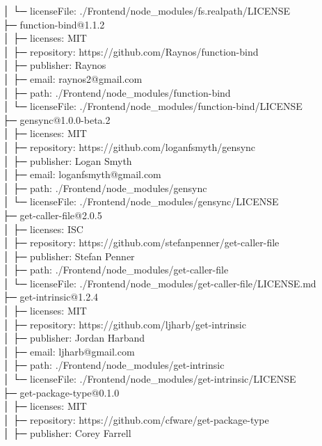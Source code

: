 │  └─ licenseFile: ./Frontend/node\_modules/fs.realpath/LICENSE\\
├─ function-bind@1.1.2\\
│  ├─ licenses: MIT\\
│  ├─ repository: https://github.com/Raynos/function-bind\\
│  ├─ publisher: Raynos\\
│  ├─ email: raynos2@gmail.com\\
│  ├─ path: ./Frontend/node\_modules/function-bind\\
│  └─ licenseFile: ./Frontend/node\_modules/function-bind/LICENSE\\
├─ gensync@1.0.0-beta.2\\
│  ├─ licenses: MIT\\
│  ├─ repository: https://github.com/loganfsmyth/gensync\\
│  ├─ publisher: Logan Smyth\\
│  ├─ email: loganfsmyth@gmail.com\\
│  ├─ path: ./Frontend/node\_modules/gensync\\
│  └─ licenseFile: ./Frontend/node\_modules/gensync/LICENSE\\
├─ get-caller-file@2.0.5\\
│  ├─ licenses: ISC\\
│  ├─ repository: https://github.com/stefanpenner/get-caller-file\\
│  ├─ publisher: Stefan Penner\\
│  ├─ path: ./Frontend/node\_modules/get-caller-file\\
│  └─ licenseFile: ./Frontend/node\_modules/get-caller-file/LICENSE.md\\
├─ get-intrinsic@1.2.4\\
│  ├─ licenses: MIT\\
│  ├─ repository: https://github.com/ljharb/get-intrinsic\\
│  ├─ publisher: Jordan Harband\\
│  ├─ email: ljharb@gmail.com\\
│  ├─ path: ./Frontend/node\_modules/get-intrinsic\\
│  └─ licenseFile: ./Frontend/node\_modules/get-intrinsic/LICENSE\\
├─ get-package-type@0.1.0\\
│  ├─ licenses: MIT\\
│  ├─ repository: https://github.com/cfware/get-package-type\\
│  ├─ publisher: Corey Farrell\\
